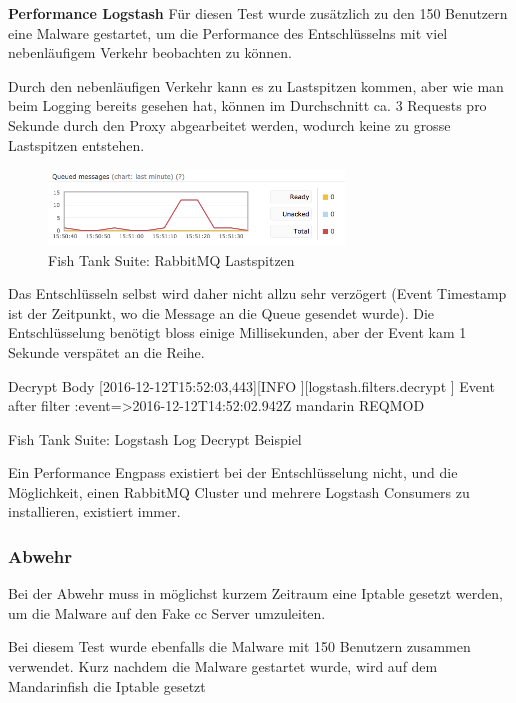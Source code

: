 \textbf{Performance Logstash}
Für diesen Test wurde zusätzlich zu den 150 Benutzern eine Malware gestartet, um die Performance des Entschlüsselns mit viel nebenläufigem Verkehr beobachten zu können.


Durch den nebenläufigen Verkehr kann es zu Lastspitzen kommen, aber wie man beim Logging bereits gesehen hat, können im Durchschnitt ca. 3 Requests pro Sekunde durch den Proxy abgearbeitet werden, wodurch keine zu grosse Lastspitzen entstehen.


\begin{figure}[H]
	\centering
	\includegraphics[width=0.7\textwidth]{img/rabbitmq-performance}
	\caption{Fish Tank Suite: RabbitMQ Lastspitzen}
	\label{fig:rabbitmq-lastspitze}
\end{figure}


Das Entschlüsseln selbst wird daher nicht allzu sehr verzögert (Event Timestamp ist der Zeitpunkt, wo die Message an die Queue gesendet wurde).
Die Entschlüsselung benötigt bloss einige Millisekunden, aber der Event kam 1 Sekunde verspätet an die Reihe.
\begin{listing}[H]
\begin{fancycode}
 Decrypt Body
[2016-12-12T15:52:03,443][INFO ][logstash.filters.decrypt ] Event after filter {:event=>2016-12-12T14:52:02.942Z mandarin REQMOD}
\end{fancycode}
\caption{Fish Tank Suite: Logstash Log Decrypt Beispiel}
\label{lst:logstash-decrypt-filter-log}
\end{listing}

Ein Performance Engpass existiert bei der Entschlüsselung nicht, und die Möglichkeit, einen RabbitMQ Cluster und mehrere Logstash Consumers zu installieren, existiert immer.


\subsubsection{Abwehr}
Bei der Abwehr muss in möglichst kurzem Zeitraum eine Iptable gesetzt werden, um die Malware auf den Fake \gls{cc} Server umzuleiten.

Bei diesem Test wurde ebenfalls die Malware mit 150 Benutzern zusammen verwendet. Kurz nachdem die Malware gestartet wurde, wird auf dem Mandarinfish die Iptable gesetzt

